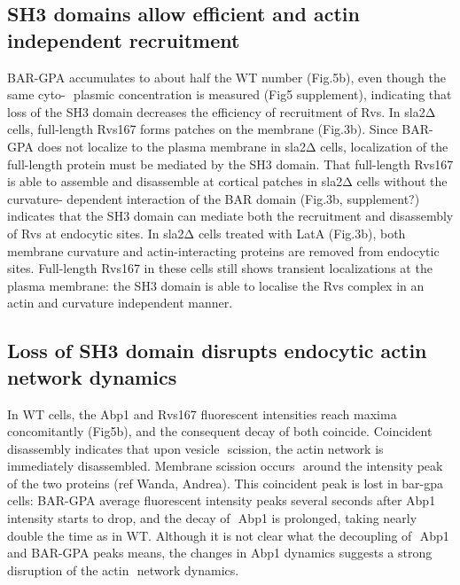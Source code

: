 \documentclass[9pt,lineno]{elife}
\begin{document}
\subsection{SH3 domains allow efficient and actin independent recruitment}

BAR-GPA accumulates to about half the WT number (Fig.5b), even though the same cyto-  plasmic concentration is measured (Fig5 supplement), indicating that loss of the SH3 domain decreases the efficiency of recruitment of Rvs. In sla2Δ cells, full-length Rvs167 forms patches on the membrane (Fig.3b). Since BAR-GPA does not localize to the plasma membrane in sla2Δ cells, localization of the full-length protein must be mediated by the SH3 domain. That full-length Rvs167 is able to assemble and disassemble at cortical patches in sla2Δ cells without the curvature- dependent interaction of the BAR domain (Fig.3b, supplement?) indicates that the SH3 domain can mediate both the recruitment and disassembly of Rvs at endocytic sites. In sla2Δ cells treated with LatA (Fig.3b), both membrane curvature and actin-interacting proteins are removed from endocytic sites. Full-length Rvs167 in these cells still shows transient localizations at the plasma membrane: the SH3 domain is able to localise the Rvs complex in an actin and curvature independent manner.  

\subsection{Loss of SH3 domain disrupts endocytic actin network dynamics}
In WT cells, the Abp1 and Rvs167 fluorescent intensities reach maxima concomitantly (Fig5b), and the consequent decay of both coincide. Coincident disassembly indicates that upon vesicle  scission, the actin network is immediately disassembled. Membrane scission occurs  around the intensity peak of the two proteins (ref Wanda, Andrea). This coincident peak is lost in bar-gpa cells: BAR-GPA average fluorescent intensity peaks several seconds after Abp1 intensity starts to drop, and the decay of  Abp1 is prolonged, taking nearly double the time as in WT. Although it is not clear what the decoupling of  Abp1 and BAR-GPA peaks means, the changes in Abp1 dynamics suggests a strong disruption of the actin  network dynamics.
\end{document}
